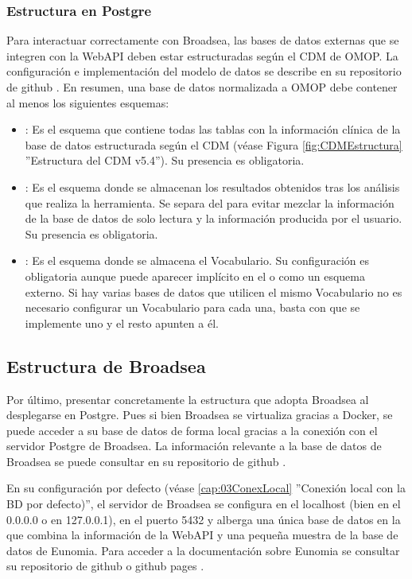 \subsubsection{Estructura en Postgre}

Para interactuar correctamente con Broadsea, las bases de datos externas que se integren con la WebAPI deben estar estructuradas según el CDM de OMOP. La configuración e implementación del modelo de datos se describe en su repositorio de github \cite{githubCDMConfig}. En resumen, una base de datos normalizada a OMOP debe contener al menos los siguientes esquemas:

\begin{itemize}
    \item \textbf{}: Es el esquema que contiene todas las tablas con la información clínica de la base de datos estructurada según el CDM (véase Figura \ref{fig:CDMEstructura} ''Estructura del CDM v5.4''). Su presencia es obligatoria.
    \item \textbf{}: Es el esquema donde se almacenan los resultados obtenidos tras los análisis que realiza la herramienta. Se separa del  para evitar mezclar la información de la base de datos de solo lectura y la información producida por el usuario. Su presencia es obligatoria.
    \item \textbf{}: Es el esquema donde se almacena el Vocabulario. Su configuración es obligatoria aunque puede aparecer implícito en el  o como un esquema externo. Si hay varias bases de datos que utilicen el mismo Vocabulario no es necesario configurar un Vocabulario para cada una, basta con que se implemente uno y el resto apunten a él.
\end{itemize}

\subsection{Estructura de Broadsea} \label{subsec:01estructuraBroadsea}

Por último, presentar concretamente la estructura que adopta Broadsea al desplegarse en Postgre. Pues si bien Broadsea se virtualiza gracias a Docker, se puede acceder a su base de datos de forma local gracias a la conexión con el servidor Postgre de Broadsea. La información relevante a la base de datos de Broadsea se puede consultar en su repositorio de github \cite{githubBroadseaDB}.

En su configuración por defecto (véase \ref{cap:03ConexLocal} ''Conexión local con la BD por defecto)'', el servidor de Broadsea se configura en el localhost (bien en el 0.0.0.0  o en 127.0.0.1), en el puerto 5432 \cite{githubBroadseaDB} y alberga una única base de datos en la que combina la información de la WebAPI y una pequeña muestra de la base de datos de Eunomia. Para acceder a la documentación sobre Eunomia se consultar su repositorio de github \cite{githubEunomia} o github pages \cite{githubPagesEunomia}.

